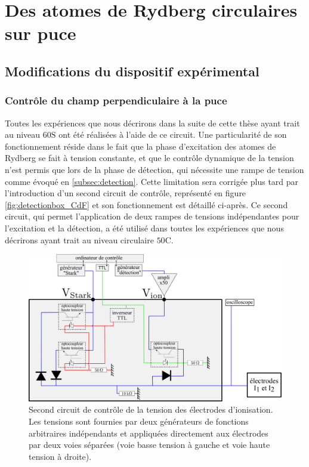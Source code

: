 \chapter{Des atomes de Rydberg circulaires sur puce}
\label{chapter:50c}

\section{Modifications du dispositif expérimental}

\subsection{Contrôle du champ perpendiculaire à la puce}

Toutes les expériences que nous décrirons dans la suite de cette thèse ayant trait au niveau $\mathrm{60S}$ ont été réalisées à l'aide de ce circuit.
Une particularité de son fonctionnement réside dans le fait que la phase d'excitation des atomes de Rydberg se fait à tension constante, et que le contrôle dynamique de la tension n'est permis que lors de la phase de détection, qui nécessite une rampe de tension comme évoqué en \ref{subsec:detection}.
Cette limitation sera corrigée plus tard par l'introduction d'un second circuit de contrôle, représenté en figure \eqref{fig:detectionbox_CdF} et son fonctionnement est détaillé ci-après.
Ce second circuit, qui permet l'application de deux rampes de tensions indépendantes pour l'excitation et la détection, a été utilisé dans toutes les expériences que nous décrirons ayant trait au niveau circulaire $\mathrm{50C}$.
%
\begin{figure}[h]
\centering
\includegraphics[width=\linewidth]{figures/setup/rydberg/detectionbox_CdF}
\caption[Second circuit de contrôle de la tension des électrodes d'ionisation]{
Second circuit de contrôle de la tension des électrodes d'ionisation.
Les tensions sont fournies par deux générateurs de fonctions arbitraires indépendants et appliquées directement aux électrodes par deux voies séparées (voie basse tension à gauche et voie haute tension à droite).
}
\label{fig:detectionbox_CdF}
\end{figure}

